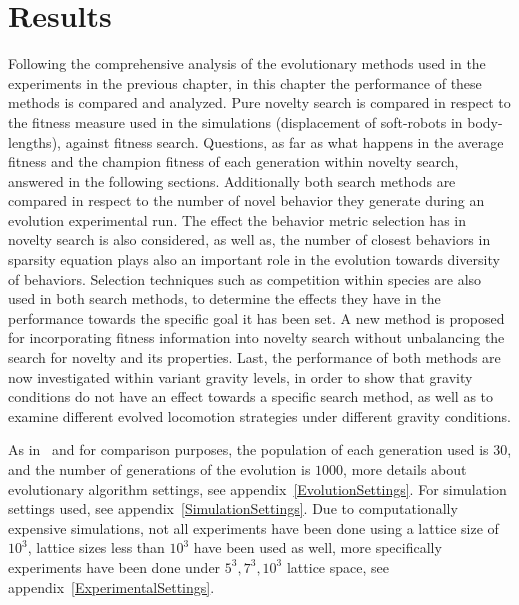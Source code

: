 
\chapter{Results} %

\label{Results} %


Following the comprehensive analysis of the evolutionary methods used in the experiments in the previous chapter, in this chapter the performance of these methods is compared and analyzed. Pure novelty search is compared in respect to the fitness measure used in the simulations (displacement of soft-robots in body-lengths), against fitness search. Questions, as far as what happens in the average fitness and the champion fitness of each generation within novelty search, answered in the following sections. Additionally both search methods are compared in respect to the number of novel behavior they generate during an evolution experimental run. The effect the behavior metric selection has in novelty search is also considered, as well as, the number of closest behaviors in sparsity equation plays also an important role in the evolution towards diversity of behaviors. Selection techniques such as competition within species are also used in both search methods, to determine the effects they have in the performance towards the specific goal it has been set. A new method is proposed for incorporating fitness information into novelty search without unbalancing the search for novelty and its properties. Last, the performance of both methods are now investigated within variant gravity levels, in order to show that gravity conditions do not have an effect towards a specific search method, as well as to examine different evolved locomotion strategies under different gravity conditions.

As in~\cite{cheney2013unshackling} and for comparison purposes, the population of each generation used is $30$, and the number of generations of the evolution is $1000$, more details about evolutionary algorithm settings, see appendix~\ref{EvolutionSettings}. For simulation settings used, see appendix~\ref{SimulationSettings}. Due to computationally expensive simulations, not all experiments have been done using a lattice size of $10^3$, lattice sizes less than $10^3$ have been used as well, more specifically experiments have been done under $5^3, 7^3, 10^3$ lattice space, see appendix~\ref{ExperimentalSettings}.



